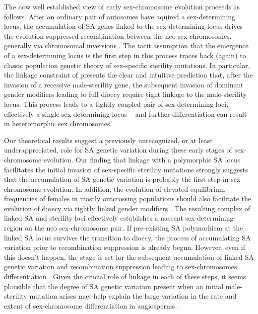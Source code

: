 \documentclass[9pt,twocolumn,twoside,lineno]{gsajnl}
\begin{document}
The now well established view of early sex-chromosome evolution proceeds as follows. After an ordinary pair of autosomes have aquired a sex-determining locus, the accumulation of SA genes linked to the sex-determining locus drives the evolution suppressed recombination between the neo sex-chromosomes, generally via chromosomal inversions \citep{Rice1987,Charlesworth2002,Bachtrog2006,Qiuetal2013,Bachtrog2014}. The tacit assumption that the emergence of a sex-determining locus is the first step in this process traces back (again) to classic population genetic theory of sex-specific sterility mutations. In particular, the linkage constraint of \citet{Charlesworth1978a} presents the clear and intuitive prediction that, after the invasion of a recessive male-sterility gene, the subsequent invasion of dominant gender modifiers leading to full dioecy require tight linkage to the male-sterility locus. This process leads to a tightly coupled pair of sex-determining loci, effectively a single sex determining locus -- and further differentiation can result in heteromorphic sex chromosomes.

Our theoretical results suggest a previously unrecognized, or at least underappreciated, role for SA genetic variation during these early stages of sex-chromosome evolution. Our finding that linkage with a polymorphic SA locus facilitates the initial invasion of sex-specific sterility mutations strongly suggests that the accumulation of SA genetic variation is probably the first step in sex chromosome evolution. In addition, the evolution of elevated equilibrium frequencies of females in mostly outcrossing populations should also facilitate the evolution of dioecy via tightly linked gender modifiers \citep{Charlesworth1978a}. The resulting complex of linked SA and sterility loci effectively establishes a nascent sex-determining-region on the neo sex-chromosome pair. If pre-existing SA polymorhism at the linked SA locus survives the transition to dioecy, the process of accumulating SA variation prior to recombination suppression is already begun. However, even if this doesn't happen,  the stage is set for the subsequent accumulation of linked SA genetic variation and recombination suppression leading to sex-chromosomes differentiation \citep{Charlesworth1978a,Rice1987,Bachtrog2006,Qiuetal2013}. Given the crucial role of linkage in each of these steps, it seems plausible that the degree of SA genetic variation present when an initial male-sterility mutation arises may help explain the large variation in the rate and extent of sex-chromosome differentiation in angiosperms \citep{Charlesworth2002,Renner2014,Bachtrog2014}.



\end{document}
